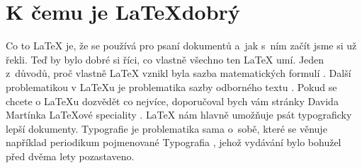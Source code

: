 \documentclass[a4paper, 11pt]{article}
\begin{document}
\section{K čemu je \LaTeX dobrý}
Co to {\LaTeX} je, že se používá pro psaní dokumentů a~jak s~ním začít jsme si už řekli. Teď by bylo dobré si říci, co vlastně všechno ten {\LaTeX} umí. Jeden z~důvodů, proč vlastně {\LaTeX} vznikl byla sazba matematických formulí \cite{Matematika}. Další problematikou v \LaTeX u je problematika sazby odborného textu \cite{Odborny}. Pokud se chcete o \LaTeX u dozvědět co nejvíce, doporučoval bych vám stránky Davida Martínka \LaTeX ové speciality \cite{Speciality}. {\LaTeX} nám hlavně umožňuje psát typograficky lepší dokumenty. Typografie je problematika sama o~sobě, které se věnuje například periodikum pojmenované Typografia \cite{Typo}, jehož vydávání bylo bohužel před dvěma lety pozastaveno.

\newpage


\end{document}
